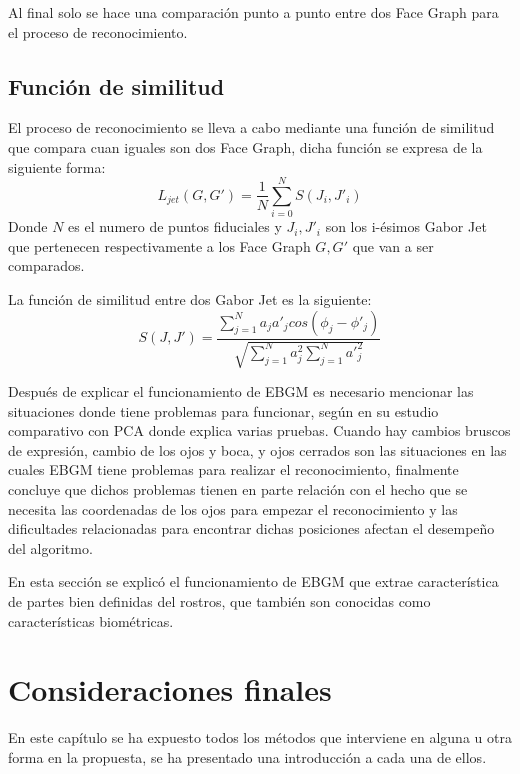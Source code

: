 Al final solo se hace una comparación punto a punto entre dos Face Graph para el proceso de reconocimiento.

\subsection{Función de similitud}
El proceso de reconocimiento se lleva a cabo mediante una función de similitud que compara cuan iguales son dos Face Graph, dicha función se expresa de la siguiente forma:
\begin{equation}
\label{FaceGraphSimiFunc}
L_{jet}(G,G')=\frac{1}{N}\sum_{i=0}^{N}S(J_{i},J'_{i})
\end{equation}
Donde $N$ es el numero de puntos fiduciales y $J_i,J'_i$ son los i-ésimos Gabor Jet que pertenecen respectivamente a los Face Graph $G,G'$ que van a ser comparados.

La función de similitud entre dos Gabor Jet es la siguiente:
\begin{equation}
\label{GaborJetSimiFunc}
S(J,J')=\frac{\sum_{j=1}^{N}a_j a'_jcos(\phi_j-\phi'_j)}{\sqrt{\sum_{j=1}^{N}a_j^2 \sum_{j=1}^{N}{a'}_j^2}}
\end{equation}

Después de explicar el funcionamiento de \ac{EBGM} es necesario mencionar las situaciones donde tiene problemas para funcionar, según \cite{givens2004features} en su estudio comparativo con \ac{PCA} donde explica varias pruebas. Cuando hay cambios bruscos de expresión, cambio de los ojos y boca, y ojos cerrados son las situaciones en las cuales \ac{EBGM} tiene problemas para realizar el reconocimiento, finalmente concluye que dichos problemas tienen en parte relación con el hecho que se necesita las coordenadas de los ojos para empezar el reconocimiento y las dificultades relacionadas para encontrar dichas posiciones afectan el desempeño del algoritmo.

En esta sección se explicó el funcionamiento de \ac{EBGM} que extrae característica de partes bien definidas del rostros, que también son conocidas como características biométricas.


\section{Consideraciones finales}
En este capítulo se ha expuesto todos los métodos que interviene en alguna u otra forma en la propuesta, se ha presentado una introducción a cada una de ellos.

